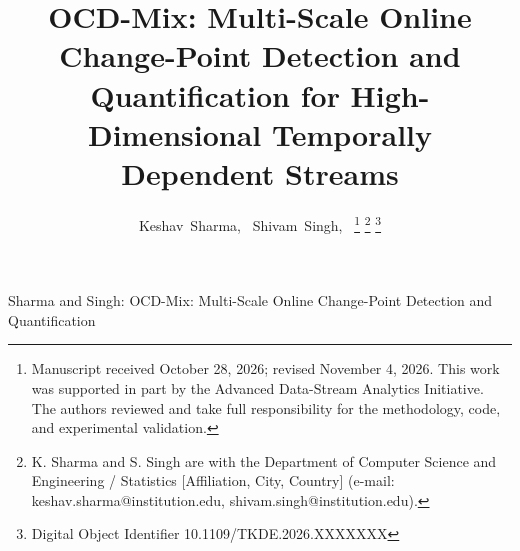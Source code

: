 \documentclass[lettersize,journal]{IEEEtran}
\begin{document}
\title{OCD-Mix: Multi-Scale Online Change-Point Detection and Quantification for High-Dimensional Temporally Dependent Streams}

\author{Keshav~Sharma,~
        Shivam~Singh,~%
\thanks{Manuscript received October 28, 2026; revised November 4, 2026. This work was supported in part by the Advanced Data-Stream Analytics Initiative. The authors reviewed and take full responsibility for the methodology, code, and experimental validation.}%
\thanks{K. Sharma and S. Singh are with the Department of Computer Science and Engineering / Statistics [Affiliation, City, Country] (e-mail: keshav.sharma@institution.edu, shivam.singh@institution.edu).}%
\thanks{Digital Object Identifier 10.1109/TKDE.2026.XXXXXXX}
}

%
{Sharma and Singh: OCD-Mix: Multi-Scale Online Change-Point Detection and Quantification}

\maketitle
\end{document}
